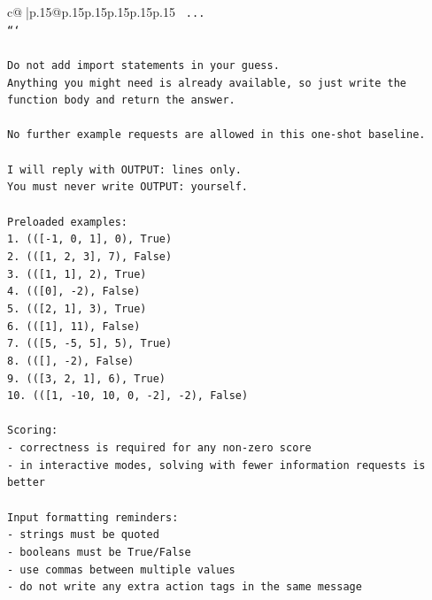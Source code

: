 \documentclass{article}
\begin{document}
{\begin{supertabular}{c@{$\;$}|p{.15\linewidth}@{}p{.15\linewidth}p{.15\linewidth}p{.15\linewidth}p{.15\linewidth}p{.15\linewidth}}
{{{\texttt{    ...} \\
\texttt{```} \\
\\ 
\texttt{Do not add import statements in your guess.} \\
\texttt{Anything you might need is already available, so just write the function body and return the answer.} \\
\\ 
\texttt{No further example requests are allowed in this one{-}shot baseline.} \\
\\ 
\texttt{I will reply with OUTPUT: lines only.} \\
\texttt{You must never write OUTPUT: yourself.} \\
\\ 
\texttt{Preloaded examples:} \\
\texttt{1. (({[}{-}1, 0, 1{]}, 0), True)} \\
\texttt{2. (({[}1, 2, 3{]}, 7), False)} \\
\texttt{3. (({[}1, 1{]}, 2), True)} \\
\texttt{4. (({[}0{]}, {-}2), False)} \\
\texttt{5. (({[}2, 1{]}, 3), True)} \\
\texttt{6. (({[}1{]}, 11), False)} \\
\texttt{7. (({[}5, {-}5, 5{]}, 5), True)} \\
\texttt{8. (({[}{]}, {-}2), False)} \\
\texttt{9. (({[}3, 2, 1{]}, 6), True)} \\
\texttt{10. (({[}1, {-}10, 10, 0, {-}2{]}, {-}2), False)} \\
\\ 
\texttt{Scoring:} \\
\texttt{{-} correctness is required for any non{-}zero score} \\
\texttt{{-} in interactive modes, solving with fewer information requests is better} \\
\\ 
\texttt{Input formatting reminders:} \\
\texttt{{-} strings must be quoted} \\
\texttt{{-} booleans must be True/False} \\
\texttt{{-} use commas between multiple values} \\
\texttt{{-} do not write any extra action tags in the same message} \\
\\ 
}}}
\end{supertabular}}
\end{document}
